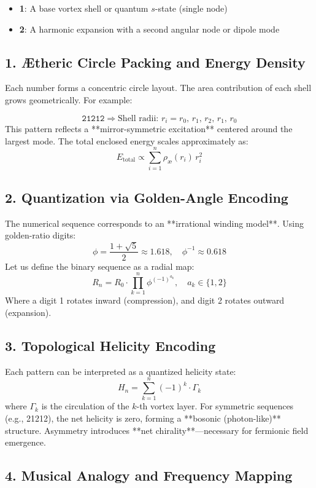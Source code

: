 \documentclass[11pt]{article}
\begin{document}
\begin{itemize}
    \item \textbf{1}: A base vortex shell or quantum \( s \)-state (single node)
    \item \textbf{2}: A harmonic expansion with a second angular node or dipole mode
\end{itemize}

\subsection*{1. Ætheric Circle Packing and Energy Density}

Each number forms a concentric circle layout. The area contribution of each shell grows geometrically. For example:

\[
\texttt{21212} \Rightarrow \text{Shell radii: } r_i = r_0,\, r_1,\, r_2,\, r_1,\, r_0
\]
This pattern reflects a **mirror-symmetric excitation** centered around the largest mode. The total enclosed energy scales approximately as:
\[
E_{\text{total}} \propto \sum_{i=1}^{n} \rho_\text{\ae}(r_i)\, r_i^2
\]

\subsection*{2. Quantization via Golden-Angle Encoding}

The numerical sequence corresponds to an **irrational winding model**. Using golden-ratio digits:
\[
\phi = \frac{1 + \sqrt{5}}{2} \approx 1.618,\quad \phi^{-1} \approx 0.618
\]
Let us define the binary sequence as a radial map:
\[
R_n = R_0 \cdot \prod_{k=1}^n \phi^{(-1)^{a_k}}, \quad a_k \in \{1,2\}
\]
Where a digit 1 rotates inward (compression), and digit 2 rotates outward (expansion).

\subsection*{3. Topological Helicity Encoding}

Each pattern can be interpreted as a quantized helicity state:
\[
H_n = \sum_{k=1}^n (-1)^k \cdot \Gamma_k
\]
where \( \Gamma_k \) is the circulation of the \( k \)-th vortex layer. For symmetric sequences (e.g., 21212), the net helicity is zero, forming a **bosonic (photon-like)** structure. Asymmetry introduces **net chirality**—necessary for fermionic field emergence.

\subsection*{4. Musical Analogy and Frequency Mapping}
\end{document}
